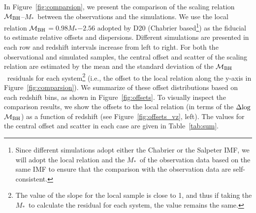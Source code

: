 \documentclass[twocolumn]{aastex631}
\def\smass{{$M_*$}}
\def\mbh{$\mathcal M_{\rm BH}$}
\begin{document}
In Figure~\ref{fig:comparsion}, we present the comparison of the scaling relation \mbh--\smass\ between the observations and the simulations. We use the local relation \mbh$=0.98$\smass$-2.56$ adopted by D20 (Chabrier based\footnote{Since different simulations adopt either the Chabrier or the Salpeter IMF, we will adopt the local relation and the \smass\ of the observation data based on the same IMF to ensure that the comparison with the observation data are self-consistent.}) as the fiducial to estimate relative offsets and dispersions. Different simulations are presented in each row and redshift intervals increase from left to right. 
For both the observational and simulated samples, the central offset and scatter of the scaling relation are estimated by the mean and the standard deviation of the \mbh\ residuals for each system\footnote{The value of the slope for the local sample is close to 1, and thus if taking the \smass\ to calculate the residual for each system, the value remains the same.} (i.e., the offset to the local relation along the y-axis in Figure~\ref{fig:comparsion}).
We summarize of these offset distributions based on each redshift bins, as shown in Figure~\ref{fig:offsets}.
To visually inspect the comparison results, we show the offsets to the local relation (in terms of the $\Delta{\rm log}$\mbh) as a function of redshift (see Figure~\ref{fig:offsets_vz}, left). 
The values for the central offset and scatter in each case are given in Table~\ref{tab:sum}. 
\end{document}
